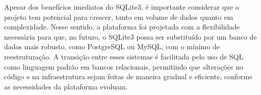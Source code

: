 Apesar dos benefícios imediatos do SQLite3, é importante considerar que o projeto tem potencial para crescer, tanto em volume de dados quanto em complexidade. Nesse sentido, a plataforma foi projetada com a flexibilidade necessária para que, no futuro, o SQLite3 possa ser substituído por um banco de dados mais robusto, como PostgreSQL ou MySQL, com o mínimo de reestruturação. A transição entre esses sistemas é facilitada pelo uso de SQL como linguagem padrão em bancos relacionais, permitindo que alterações no código e na infraestrutura sejam feitas de maneira gradual e eficiente, conforme as necessidades da plataforma evoluam.